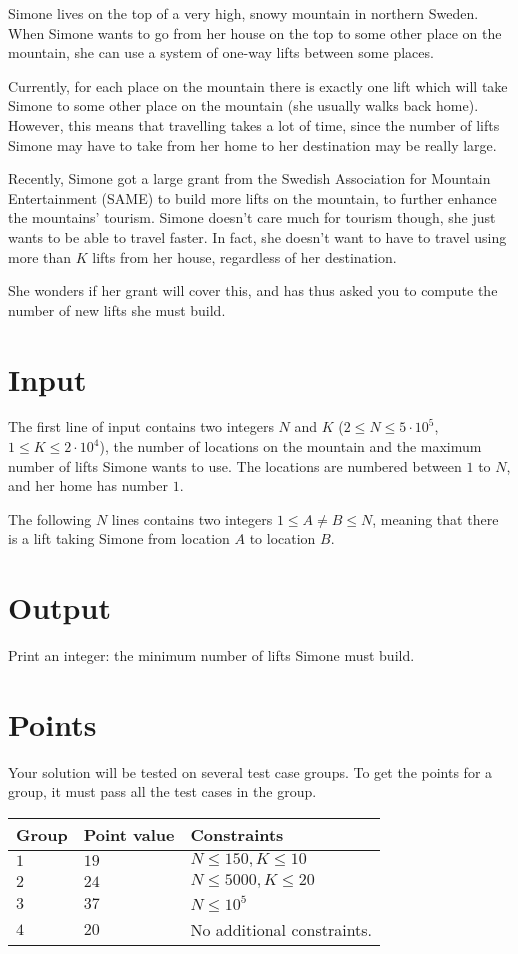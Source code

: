 
Simone lives on the top of a very high, snowy mountain in northern Sweden. When Simone wants to go from her house on the top
to some other place on the mountain, she can use a system of one-way lifts between some places.

Currently, for each place on the mountain there is exactly one lift which will take Simone to some other place on the
mountain (she usually walks back home). However, this means that travelling takes a lot of time, since the number
of lifts Simone may have to take from her home to her destination may be really large.

Recently, Simone got a large grant from the Swedish Association for Mountain Entertainment (SAME) to build more lifts on
the mountain, to further enhance the mountains' tourism. Simone doesn't care much for tourism though, she just wants
to be able to travel faster. In fact, she doesn't want to have to travel using more than $K$ lifts from her house,
regardless of her destination.

She wonders if her grant will cover this, and has thus asked you to compute the number of new lifts she must build.

\section*{Input}
The first line of input contains two integers $N$ and $K$ ($2 \le N \leq 5 \cdot 10^5$, $1 \le K \leq 2 \cdot 10^4$),
the number of locations on the mountain and the maximum number of lifts Simone wants to use. The locations are
numbered between $1$ to $N$, and her home has number $1$.

The following $N$ lines contains two integers $1 \le A \not= B \le N$, meaning that there is a lift taking
Simone from location $A$ to location $B$.

\section*{Output}
Print an integer: the minimum number of lifts Simone must build.

\section*{Points}
Your solution will be tested on several test case groups.
To get the points for a group, it must pass all the test cases in the group.

\noindent
\begin{tabular}{| l | l | p{12cm} |}
  \hline
  \textbf{Group} & \textbf{Point value} & \textbf{Constraints} \\ \hline
  $1$    & $19$      & $N \leq 150, K \leq 10$ \\ \hline
  $2$    & $24$      & $N \leq 5000, K \leq 20$ \\ \hline
  $3$    & $37$      & $N \leq 10^5$ \\ \hline
  $4$    & $20$      & No additional constraints. \\ \hline
\end{tabular}
